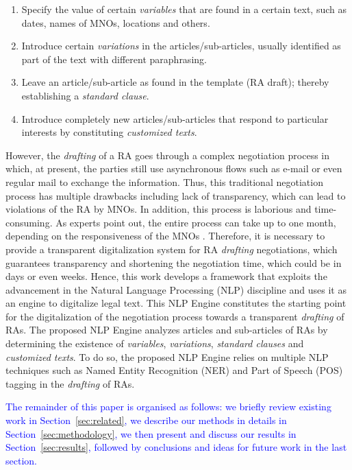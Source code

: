 \begin{enumerate}
\item Specify the value of certain \textit{variables} that are found in a certain text, such as dates, names of MNOs, locations and others.
\item Introduce certain \textit{variations} in the articles/sub-articles, usually identified as part of the text with different paraphrasing.
\item Leave an article/sub-article as found in the template (RA draft); thereby establishing a \textit{standard clause}.
\item Introduce completely new articles/sub-articles that respond to particular interests by constituting \textit{customized texts}.
\end{enumerate}

However, the \textit{drafting} of a RA goes through a complex negotiation process in which, at present, the parties still use asynchronous flows such as e-mail or even regular mail to exchange the information. Thus, this traditional negotiation process has multiple drawbacks including lack of transparency, which can lead to violations of the RA by MNOs. In addition, this process is laborious and time-consuming. As experts point out, the entire process can take up to one month, depending on the responsiveness of the MNOs \cite{ROCCO2017a}. Therefore, it is necessary to provide a transparent digitalization system for RA \textit{drafting} negotiations, which guarantees transparency and shortening the negotiation time, which could be in days or even weeks. Hence, this work develops a framework that exploits the advancement in the Natural Language Processing (NLP) discipline and uses it as an engine to digitalize legal text. This NLP Engine constitutes the starting point for the digitalization of the negotiation process towards a transparent \textit{drafting} of RAs. The proposed NLP Engine analyzes articles and sub-articles of RAs by determining the existence of \textit{variables}, \textit{variations}, \textit{standard clauses} and \textit{customized texts}. To do so, the proposed NLP Engine relies on multiple NLP techniques such as Named Entity Recognition (NER) and Part of Speech (POS) tagging in the \textit{drafting} of RAs.




\textcolor{blue}{The remainder of this paper is organised as follows: we briefly review existing work in Section~\ref{sec:related}, we describe our methods in details in Section~\ref{sec:methodology}, we then present and discuss our results in Section~\ref{sec:results}, followed by conclusions and ideas for future work in the last section.}


